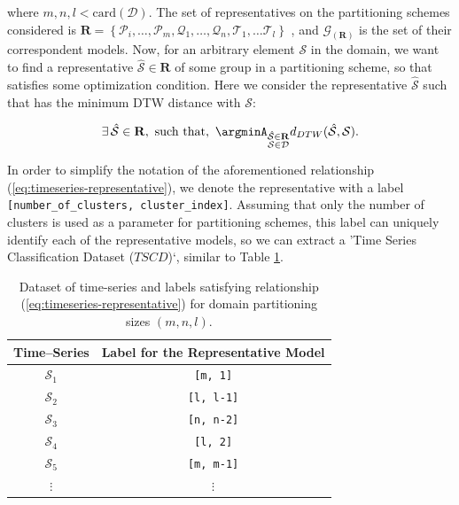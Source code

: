 where $m, n, l < \textrm{card}(\mathcal{D})$. The set of representatives on the partitioning schemes considered is $\mathbf{R} = \left\{\mathcal{P}_{i}, \ldots, \mathcal{P}_{m}, \mathcal{Q}_{1}, \ldots, \mathcal{Q}_{n}, \mathcal{T}_{1}, \ldots \mathcal{T}_{l} \right\}$ , and $\mathcal{G}_{(\mathbf{R})}$ is the set of their correspondent models. Now, for an arbitrary element $\mathcal{S}$ in the domain, we want to find a representative $\mathcal{\hat{S}} \in \mathbf{R}$ of some group in a partitioning scheme, so that satisfies some optimization condition. Here we consider the representative $\mathcal{\hat{S}}$ such that has the minimum DTW distance with $\mathcal{S}$:

\begin{equation}\label{eq:timeseries-representative}
 \exists\, \mathcal{\hat{S}} \in \mathbf{R}, \,\, \textrm{such that}, \,\, \argminA_{\substack{\mathcal{\hat{S}} \in \mathbf{R}\\\mathcal{S} \in \mathcal{D}}} d_{DTW}(\mathcal{\hat{S}}, \mathcal{S}).
\end{equation}

In order to simplify the notation of the aforementioned relationship (\ref{eq:timeseries-representative}), we denote the representative with a label \texttt{[number\_of\_clusters, cluster\_index]}. Assuming that only the number of clusters is used as a parameter for partitioning schemes, this label can uniquely identify each of the representative models, so we can extract a 'Time Series Classification Dataset ($TSCD$)`, similar to Table \ref{Tab:TSClassificationDataset}.

\begin{table}[h]
	\centering
	\begin{tabular}{|c|c|}
		\hline
		Time--Series   & Label for the Representative Model\\ \hline
		$\mathcal{S}_{1}$  & \texttt{[m, 1]} \\ \hline
		$\mathcal{S}_{2}$ & \texttt{[l, l-1]} \\ \hline
		$\mathcal{S}_{3}$ & \texttt{[n, n-2]} \\ \hline
		$\mathcal{S}_{4}$ & \texttt{[l, 2]} \\ \hline
		$\mathcal{S}_{5}$ & \texttt{[m, m-1]} \\ \hline
		$\vdots$       & $\vdots$ \\ \hline
	\end{tabular}
	\caption{Dataset of time-series and labels satisfying relationship (\ref{eq:timeseries-representative}) for domain partitioning sizes $(m,n,l)$.}
	\label{Tab:TSClassificationDataset}
\end{table}

